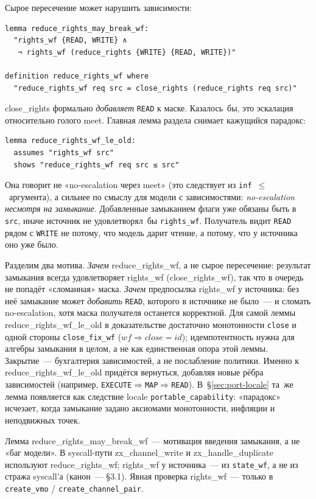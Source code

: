 \documentclass[11pt,a4paper]{article}
\newcommand{\isabel}[1]{{\isabelleit #1}}
\newcommand{\lemmaname}[1]{\isabel{#1}}
\begin{document}
Сырое пересечение может нарушить зависимости:
\begin{lstlisting}
lemma reduce_rights_may_break_wf:
  "rights_wf {READ, WRITE} ∧
   ¬ rights_wf (reduce_rights {WRITE} {READ, WRITE})"

definition reduce_rights_wf where
  "reduce_rights_wf req src = close_rights (reduce_rights req src)"
\end{lstlisting}
\lemmaname{close\_rights} формально \emph{добавляет} \texttt{READ} к
маске. Казалось~бы, это эскалация относительно голого meet. Главная
лемма раздела снимает кажущийся парадокс:
\begin{lstlisting}
lemma reduce_rights_wf_le_old:
  assumes "rights_wf src"
  shows "reduce_rights_wf req src ≤ src"
\end{lstlisting}
Она говорит не «no-escalation через meet» (это следствует из
\texttt{inf}~$\le$~аргумента), а сильнее по смыслу для модели с
зависимостями: \emph{no-escalation несмотря на замыкание}. Добавленные
замыканием флаги уже обязаны быть в \texttt{src}, иначе источник не
удовлетворял~бы \texttt{rights\_wf}. Получатель видит \texttt{READ} рядом
с \texttt{WRITE} не потому, что модель дарит чтение, а потому, что у
источника оно уже было.

Разделим два мотива. \emph{Зачем} \lemmaname{reduce\_rights\_wf}, а не
сырое пересечение: результат замыкания всегда удовлетворяет
\lemmaname{rights\_wf} (\lemmaname{close\_rights\_wf}), так что в очередь
не попадёт «сломанная» маска. \emph{Зачем} предпосылка
\lemmaname{rights\_wf} у источника: без неё замыкание может
\emph{добавить} \texttt{READ}, которого в источнике не было~--- и
сломать no-escalation, хотя маска получателя останется корректной.
Для самой леммы \lemmaname{reduce\_rights\_wf\_le\_old} в доказательстве
достаточно монотонности \texttt{close} и одной стороны
\texttt{close\_fix\_wf} ($\mathit{wf}\Rightarrow\mathit{close}=\mathit{id}$);
идемпотентность нужна для алгебры замыкания в целом, а не как
единственная опора этой леммы. Закрытие~--- бухгалтерия зависимостей,
а не послабление политики. Именно к
\lemmaname{reduce\_rights\_wf\_le\_old} придётся вернуться, добавляя
новые рёбра зависимостей (например, \texttt{EXECUTE}$\Rightarrow$\texttt{MAP}$\Rightarrow$\texttt{READ}).
В~\S\ref{sec:port-locale} та~же лемма появляется как следствие locale
\texttt{portable\_capability}: «парадокс» исчезает, когда замыкание
задано аксиомами монотонности, инфляции и неподвижных точек.

Лемма \lemmaname{reduce\_rights\_may\_break\_wf}~--- мотивация введения
замыкания, а не «баг модели». В syscall-пути
\lemmaname{zx\_channel\_write} и \lemmaname{zx\_handle\_duplicate}
используют \lemmaname{reduce\_rights\_wf}; \lemmaname{rights\_wf} у
источника~--- из \texttt{state\_wf}, а не из стража syscall'а
(канон~--- §3.1). Явная проверка \lemmaname{rights\_wf}~--- только в
\texttt{create\_vmo} / \texttt{create\_channel\_pair}.
\end{document}
